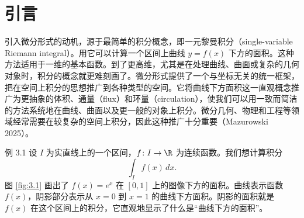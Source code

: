 \section{引言}
\label{sec:3.1}

引入微分形式的动机，源于最简单的积分概念，即一元黎曼积分（single-variable Riemann integral）。用它可以计算一个区间上曲线 $y=f(x)$ 下方的面积。这种方法适用于一维的基本函数。到了更高维，尤其是在处理曲线、曲面或复杂的几何对象时，积分的概念就更难刻画了。微分形式提供了一个与坐标无关的统一框架，把在空间上积分的思想推广到各种类型的空间。它将曲线下方面积这一直观概念推广为更抽象的体积、通量（flux）和环量（circulation），使我们可以用一致而简洁的方法系统地在曲线、曲面以及更一般的对象上积分。微分几何、物理和工程等领域经常需要在较复杂的空间上积分，因此这种推广十分重要（Mazurowski 2025）。

\begin{statement}{例 3.1}{}
设 $I$ 为实直线上的一个区间，$f\colon I\to\R$ 为连续函数。我们想计算积分
\[
  \int_I f(x)\,dx.
\]
图 \ref{fig:3.1} 画出了 $f(x)=e^x$ 在 $[0,1]$ 上的图像下方的面积。曲线表示函数 $f(x)$，阴影部分表示从 $x=0$ 到 $x=1$ 的曲线下方面积。阴影的面积就是 $f(x)$ 在这个区间上的积分，它直观地显示了什么是“曲线下方的面积”。
\end{statement}

\begin{figure}[tbp]
\centering

\end{figure}

